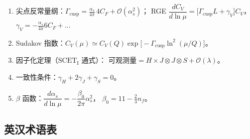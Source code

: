 \documentclass[UTF8,a4paper,11pt]{ctexart}
\theoremstyle{definition}
\theoremstyle{remark}
\theoremstyle{plain}
\newcommand{\as}{\alpha_s}
\newcommand{\CF}{C_F}
\newcommand{\Gcusp}{\Gamma_{\mathrm{cusp}}}
\newcommand{\SCETI}{\text{SCET}_{\mathrm{I}}}
\begin{document}
\begin{enumerate}[label=\textbf{F\arabic*.}, leftmargin=1.3cm]
      \begin{equation}
        C_V=1+\frac{\as\CF}{4\pi}\Big[-L^2+3L-8+\frac{\pi^2}{6}\Big],
        \qquad L=\ln\frac{Q^2}{\mu^2} .
      \end{equation}
\item 尖点反常量纲：$\Gcusp=\frac{\as}{4\pi}\,4\CF+\mathcal O(\as^2)$；
      RGE $\dfrac{dC_V}{d\ln\mu}=\big[\Gcusp L+\gamma_V\big]C_V$，
      $\gamma_V=-\frac{\as}{4\pi}6\CF+\dots$
\item Sudakov 指数：$C_V(\mu)\simeq C_V(Q)\exp\big[-\Gcusp\ln^2(\mu/Q)\big]$。
\item 因子化定理（$\SCETI$ 通式）：
      $\text{可观测量}=H\times J\otimes J\otimes S+\mathcal O(\lambda)$。
\item 一致性条件：$\gamma_H+2\gamma_J+\gamma_S=0$。
\item $\beta$ 函数：$\dfrac{d\as}{d\ln\mu}=-\dfrac{\beta_0}{2\pi}\as^2$，
      $\beta_0=11-\frac23n_f$。
\end{enumerate}

\subsection{英汉术语表}
\label{subsec:terms}
\end{document}
